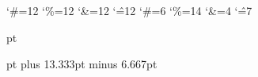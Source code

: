 


\catcode`\#=12 \catcode`\%=12 \catcode`\&=12 \catcode`\^=12
\catcode`\#=6 \catcode`\%=14 \catcode`\&=4 \catcode`\^=7
%

\XrefSideAlignfalse
\ColNotesfalse
\XrefTopfillfalse


\def\FootNoteRuleLeftIndent{\hskip 0.00 mm}
\def\FootNoteRuleRightIndent{\hss}
\def\FootNoteRuleThickness{0.5 pt}
\def\FootNoteRuleWidth{1.00}
\def\BelowFootNoteRuleSpace{2.0 pt}
 pt

\def\StudyNoteRuleLeftIndent{\hskip 0.00 mm}
\def\StudyNoteRuleRightIndent{\hss}
\def\StudyNoteRuleThickness{0.5 pt}
\def\StudyNoteRuleWidth{1.00}
\def\BelowStudyNoteRuleSpace{2.0 pt}
 pt
\InterNoteSpace=3.5pt
\NoteGutterRulefalse
\JoinGutterRulefalse
\internoteskip=11.667pt plus 13.333pt minus 6.667pt


\def\HeaderPosition{0.835}
\def\FooterPosition{0.308}
\def\RangeSeparator{\kern.1em–\kern.1em} %
\def\ChapterVerseSeparator{\kern.02em:\kern.02em} %
\def\RangeChapSeparator{\kern.1em–\kern.1em}
\def\BookChapSeparator{\ }

